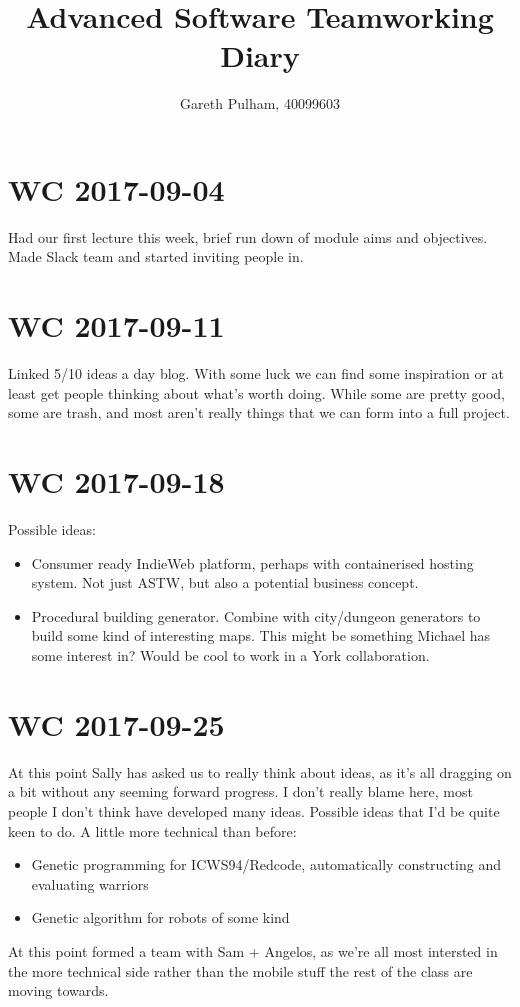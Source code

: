 \documentclass[a4paper]{article}
\begin{document}
\begin{titlepage}
    \title{Advanced Software Teamworking Diary}
    \author{Gareth Pulham, 40099603}
    \maketitle
    \thispagestyle{empty}
\end{titlepage}

\section{WC 2017-09-04}
    Had our first lecture this week, brief run down of module aims and objectives.
    Made Slack team and started inviting people in.
\section{WC 2017-09-11}
    Linked 5/10 ideas a day blog. With some luck we can find some inspiration or at least get people thinking about
    what's worth doing. While some are pretty good, some are trash, and most aren't really things that we can form into
    a full project.
\section{WC 2017-09-18}
    Possible ideas:
    \begin{itemize}
        \item Consumer ready IndieWeb platform, perhaps with containerised hosting system. Not just ASTW, but also a
            potential business concept.
        \item Procedural building generator. Combine with city/dungeon generators to build some kind of interesting
            maps. This might be something Michael has some interest in? Would be cool to work in a York collaboration.
    \end{itemize}
\section{WC 2017-09-25}
    At this point Sally has asked us to really think about ideas, as it's all dragging on a bit without any seeming
    forward progress. I don't really blame here, most people I don't think have developed many ideas.
    Possible ideas that I'd be quite keen to do. A little more technical than before:
    \begin{itemize}
        \item Genetic programming for ICWS94/Redcode, automatically constructing and evaluating warriors
        \item Genetic algorithm for robots of some kind
    \end{itemize}
    At this point formed a team with Sam + Angelos, as we're all most intersted in the more technical side rather than
    the mobile stuff the rest of the class are moving towards.
\end{document}
